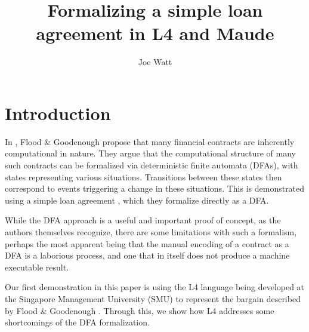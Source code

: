 \documentclass{article}
\title{Formalizing a simple loan agreement in L4 and Maude}
\author{Joe Watt}
\begin{document}
\maketitle


\tableofcontents

\newpage


\section{Introduction}



In \cite{contract_as_automaton}, Flood \& Goodenough propose that many
financial contracts are inherently computational in nature.
They argue that the computational structure of many such contracts can be
formalized via deterministic finite automata (DFAs), with states representing
various situations.
Transitions between these states then correspond to events triggering a change
in these situations.
This is demonstrated using a simple loan agreement \cite{contract_as_automaton},
which they formalize directly as a DFA.

While the DFA approach is a useful and important proof of concept, as the authors
themselves recognize, there are some limitations with such a formalism, perhaps
the most apparent being that the manual encoding of a contract as a DFA is a
laborious process, and one that in itself does not produce a machine executable
result.

Our first demonstration in this paper is using the L4 language being developed
at the Singapore Management University (SMU)
to represent the bargain described by Flood \& Goodenough
\cite{contract_as_automaton}.
Through this, we show how L4 addresses some shortcomings of the DFA
formalization.
\end{document}
